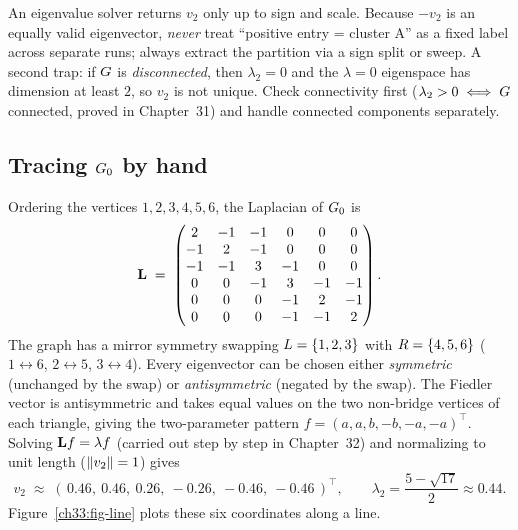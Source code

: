 \begin{trapbox}
An eigenvalue solver returns $v_2$ only up to sign and scale. Because $-v_2$ is an equally valid eigenvector, \emph{never} treat ``positive entry = cluster A'' as a fixed label across separate runs; always extract the partition via a sign split or sweep.
A second trap: if $G$ is \emph{disconnected}, then $\lambda_2=0$ and the $\lambda=0$ eigenspace has dimension at least $2$, so $v_2$ is not unique. Check connectivity first ($\lambda_2 > 0 \iff G$ connected, proved in Chapter~31) and handle connected components separately.
\end{trapbox}

\subsection*{Tracing $G_0$ by hand}
\label{ch33:trace-bisection}

Ordering the vertices $1,2,3,4,5,6$, the Laplacian of $G_0$ is
\[
  \mathbf{L} \;=\;
  \begin{pmatrix}
    2 & -1 & -1 & 0 & 0 & 0\\
    -1 & 2 & -1 & 0 & 0 & 0\\
    -1 & -1 & 3 & -1 & 0 & 0\\
    0 & 0 & -1 & 3 & -1 & -1\\
    0 & 0 & 0 & -1 & 2 & -1\\
    0 & 0 & 0 & -1 & -1 & 2
  \end{pmatrix}.
\]
The graph has a mirror symmetry swapping $L=\{1,2,3\}$ with $R=\{4,5,6\}$ ($1\!\leftrightarrow\!6$,
$2\!\leftrightarrow\!5$, $3\!\leftrightarrow\!4$). Every eigenvector can be chosen either \emph{symmetric} (unchanged by the swap) or \emph{antisymmetric} (negated by the swap). The Fiedler vector is antisymmetric and takes equal values on the two non-bridge vertices of each triangle, giving the two-parameter pattern $f = (a,a,b,-b,-a,-a)^\top$. Solving $\mathbf{L} f = \lambda f$ (carried out step by step in Chapter~32) and normalizing to unit length ($\lVert v_2\rVert=1$) gives
\[
  v_2 \;\approx\; (\,0.46,\ 0.46,\ 0.26,\ -0.26,\ -0.46,\ -0.46\,)^\top,
  \qquad \lambda_2 = \frac{5-\sqrt{17}}{2} \approx 0.44.
\]
Figure~\ref{ch33:fig-line} plots these six coordinates along a line.

